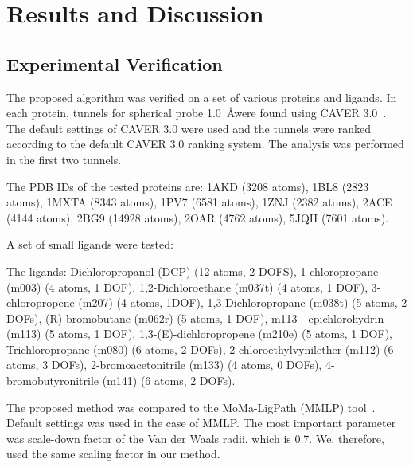 \documentclass{bmcart}
\begin{document}
\section*{Results and Discussion}
\subsection*{Experimental Verification}

The proposed algorithm was verified on a set of various proteins and ligands. 
In each protein, tunnels for spherical probe 1.0~\AA were found using CAVER 3.0~\cite{caver3}.
The default settings of CAVER 3.0 were used and the tunnels were ranked according to the default CAVER 3.0 ranking system.
The analysis was performed in the first two tunnels.

The PDB IDs of the tested proteins are:
1AKD (3208 atoms),
1BL8 (2823 atoms),
1MXTA (8343 atoms),
1PV7 (6581 atoms),
1ZNJ (2382 atoms),
2ACE (4144 atoms),
2BG9 (14928 atoms),
2OAR (4762 atoms),
5JQH (7601 atoms).

A set of small ligands were tested:

The ligands:
Dichloropropanol (DCP) (12 atoms, 2 DOFS),
1-chloropropane (m003) (4 atoms, 1 DOF),
1,2-Dichloroethane (m037t) (4 atoms, 1 DOF),
3-chloropropene (m207) (4 atoms, 1DOF),
1,3-Dichloropropane (m038t) (5 atoms, 2 DOFs),
(R)-bromobutane (m062r) (5 atoms, 1 DOF),
m113 - epichlorohydrin (m113) (5 atoms, 1 DOF),
1,3-(E)-dichloropropene (m210e) (5 atoms, 1 DOF),
Trichloropropane (m080) (6 atoms, 2 DOFs),
2-chloroethylvynilether (m112) (6 atoms, 3 DOFs),
2-bromoacetonitrile (m133) (4 atoms, 0 DOFs),
4-bromobutyronitrile (m141) (6 atoms, 2 DOFs).



The proposed method was compared to the MoMa-LigPath (MMLP) tool~\cite{cortes2010simulating}.
Default settings was used in the case of MMLP. The most important parameter was scale-down factor of the Van der Waals radii, which is 
0.7. 
We, therefore, used the same scaling factor in our method.
\end{document}
